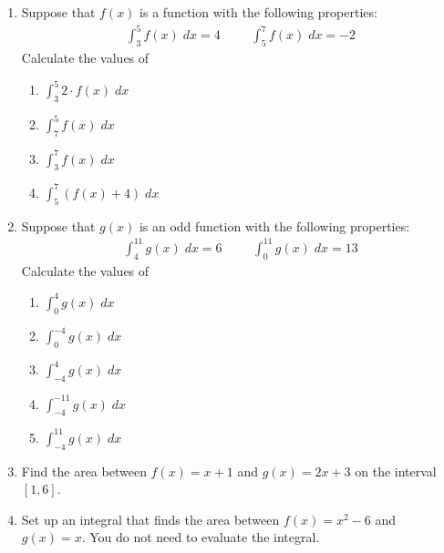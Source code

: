 \documentclass[11pt]{article}
\begin{document}
\drawtitle

\begin{enumerate}
\item Suppose that $f(x)$ is a function with the following properties:
  \begin{align*}
    \int_3^5 f(x)\;dx = 4 &&& \int_5^7 f(x)\;dx = -2
  \end{align*}
  Calculate the values of
  \begin{enumerate}
  \item $\displaystyle \int_3^5 2\cdot f(x)\;dx$
    \vfill
  \item $\displaystyle \int_7^5 f(x)\;dx$
    \vfill
  \item $\displaystyle \int_3^7 f(x)\;dx$
    \vfill
  \item $\displaystyle \int_5^7 (f(x) + 4)\;dx$
    \vfill
  \end{enumerate}

\newpage

\item Suppose that $g(x)$ is an odd function with the following properties:
  \begin{align*}
    \int_4^{11} g(x)\;dx = 6 &&& \int_0^{11} g(x)\;dx = 13
  \end{align*}
  Calculate the values of
  \begin{enumerate}
  \item $\displaystyle \int_0^4 g(x)\;dx$
    \vfill
  \item $\displaystyle \int_0^{-4} g(x)\;dx$
    \vfill
  \item $\displaystyle \int_{-4}^4 g(x)\;dx$
    \vfill

    \newpage

  \item $\displaystyle \int_{-4}^{-11} g(x)\;dx$
    \vfill
  \item $\displaystyle \int_{-4}^{11} g(x)\;dx$
    \vfill
  \end{enumerate}

  \newpage

\item Find the area between $f(x) = x+1$ and $g(x) = 2x+3$ on the
  interval $[1,6]$.

  \vfill

\item Set up an integral that finds the area between $f(x) = x^2 - 6$
  and $g(x) = x$.  You do not need to evaluate the integral.

  \vfill

  \newpage


\end{enumerate}
\end{document}

